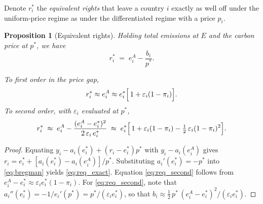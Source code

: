 \documentclass[12pt,english]{article}
\newtheorem{proposition}{Proposition}
\theoremstyle{remark}
\begin{document}
Denote $r^*_i$ the \textit{equivalent rights} that leave a country $i$ exactly as well off under the uniform-price regime as under the differentiated regime with a price $p_i$. 
\begin{proposition}[Equivalent rights]\label{prop:equiv}
Holding total emissions at $E$ and the carbon price at $p^*$, we have
\begin{equation}
  r^*_i \;=\; e^A_i - \frac{b_i}{p^*}. 
  \label{eq:req_exact}
\end{equation}

To first order in the price gap, 
\begin{equation}
  r^*_i \approx e^A_i \approx e^*_i\Bigl[\,1+\varepsilon_i(1-\pi_i)\Bigr].
    \label{eq:req_first}
\end{equation}
To second order, with $\varepsilon_i$ evaluated at $p^*$,
\begin{equation}
  r^*_i \;\approx\; e^A_i - \frac{(e^A_i-e^*_i)^2}{2\,\varepsilon_i\,e^*_i}
  \;\approx\; e^*_i\Bigl[\,1+\varepsilon_i(1-\pi_i)-\tfrac12\,\varepsilon_i(1-\pi_i)^2\Bigr].
  \label{eq:req_second}
\end{equation}
\end{proposition}

\begin{proof}
Equating $y_i-a_i(e^*_i)+(r_i-e^*_i)p^*$ with $y_i-a_i(e^A_i)$ gives $r_i=e^*_i+[a_i(e^*_i)-a_i(e^A_i)]/p^*$. Substituting $a_i'(e^*_i)=-p^*$ into \eqref{eq:bregman} yields \eqref{eq:req_exact}. Equation \eqref{eq:req_second} follows from $e^A_i-e^*_i\approx\varepsilon_i e^*_i(1-\pi_i)$. For \eqref{eq:req_second}, note that $a_i''(e^*_i)=-1/e_i'(p^*)=p^*/(\varepsilon_i e^*_i)$, so that $b_i\approx \tfrac12\,p^*\,(e^A_i-e^*_i)^2/(\varepsilon_i e^*_i)$. 
\end{proof}
\end{document}

